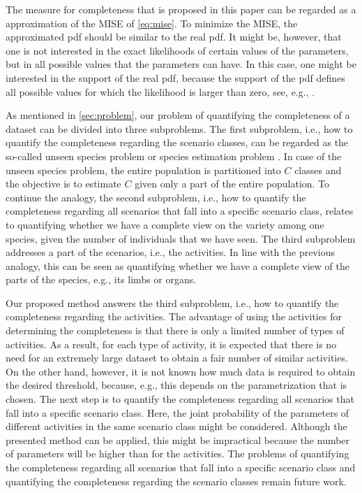 The measure for completeness that is proposed in this paper can be regarded as a approximation of the MISE of \cref{eq:mise}. To minimize the MISE, the approximated pdf should be similar to the real pdf. It might be, however, that one is not interested in the exact likelihoods of certain values of the parameters, but in all possible values that the parameters can have. In this case, one might be interested in the support of the real pdf, because the support of the pdf defines all possible values for which the likelihood is larger than zero, see, e.g., \textcite{scholkopf2001estimating}.

As mentioned in \cref{sec:problem}, our problem of quantifying the completeness of a dataset can be divided into three subproblems. The first subproblem, i.e., how to quantify the completeness regarding the scenario classes, can be regarded as the so-called unseen species problem \cite{bunge1993estimating, gandolfi2004nonparametric} or species estimation problem \cite{yang2012estimating}. In case of the unseen species problem, the entire population is partitioned into $C$ classes and the objective is to estimate $C$ given only a part of the entire population. To continue the analogy, the second subproblem, i.e., how to quantify the completeness regarding all scenarios that fall into a specific scenario class, relates to quantifying whether we have a complete view on the variety among one species, given the number of individuals that we have seen. The third subproblem addresses a part of the scenarios, i.e., the activities. In line with the previous analogy, this can be seen as quantifying whether we have a complete view of the parts of the species, e.g., its limbs or organs.

Our proposed method answers the third subproblem, i.e., how to quantify the completeness regarding the activities.  
The advantage of using the activities for determining the completeness is that there is only a limited number of types of activities. As a result, for each type of activity, it is expected that there is no need for an extremely large dataset to obtain a fair number of similar activities. On the other hand, however, it is not known how much data is required to obtain the desired threshold, because, e.g., this depends on the parametrization that is chosen.  
The next step is to quantify the completeness regarding all scenarios that fall into a specific scenario class. Here, the joint probability of the parameters of different activities in the same scenario class might be considered. Although the presented method can be applied, this might be impractical because the number of parameters will be higher than for the activities. The problems of quantifying the completeness regarding all scenarios that fall into a specific scenario class and quantifying the completeness regarding the scenario classes remain future work.
